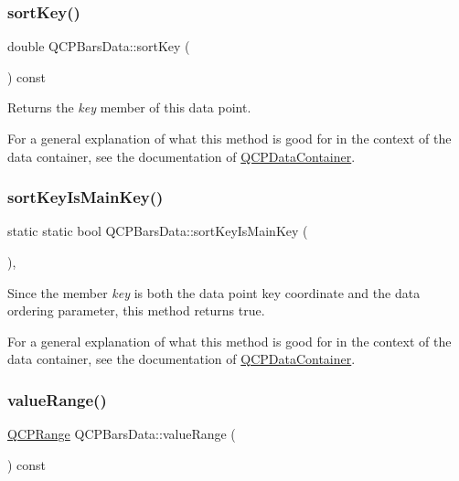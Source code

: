 \subsubsection{\texorpdfstring{sort\+Key()}{sortKey()}}
{\footnotesize\ttfamily double Q\+C\+P\+Bars\+Data\+::sort\+Key (\begin{DoxyParamCaption}{ }\end{DoxyParamCaption}) const\hspace{0.3cm}{\ttfamily [inline]}}

Returns the {\itshape key} member of this data point.

For a general explanation of what this method is good for in the context of the data container, see the documentation of \hyperlink{class_q_c_p_data_container}{Q\+C\+P\+Data\+Container}. \mbox{\label{class_q_c_p_bars_data_aebaabda335bd4c9f81bd585d16b63aa8}} 
\subsubsection{\texorpdfstring{sort\+Key\+Is\+Main\+Key()}{sortKeyIsMainKey()}}
{\footnotesize\ttfamily static static bool Q\+C\+P\+Bars\+Data\+::sort\+Key\+Is\+Main\+Key (\begin{DoxyParamCaption}{ }\end{DoxyParamCaption})\hspace{0.3cm}{\ttfamily [inline]}, {\ttfamily [static]}}

Since the member {\itshape key} is both the data point key coordinate and the data ordering parameter, this method returns true.

For a general explanation of what this method is good for in the context of the data container, see the documentation of \hyperlink{class_q_c_p_data_container}{Q\+C\+P\+Data\+Container}. \mbox{\label{class_q_c_p_bars_data_acf3e6479dacacd6c81eebe7d4cd62185}} 
\subsubsection{\texorpdfstring{value\+Range()}{valueRange()}}
{\footnotesize\ttfamily \hyperlink{class_q_c_p_range}{Q\+C\+P\+Range} Q\+C\+P\+Bars\+Data\+::value\+Range (\begin{DoxyParamCaption}{ }\end{DoxyParamCaption}) const\hspace{0.3cm}{\ttfamily [inline]}}

